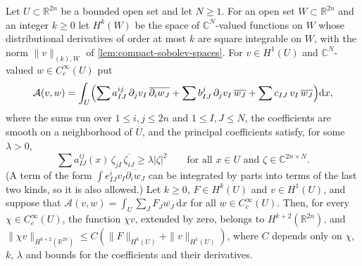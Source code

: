\begin{lemma}\label{lem:divergence-form-interior-regularity}
Let $U\subset\mathbb R^{2n}$ be a bounded open set and let $N\geq1$. For an open set $W\subset\mathbb R^{2n}$ and an integer $k\geq0$ let $H^k(W)$ be the space of $\mathbb C^N$-valued functions on $W$ whose distributional derivatives of order at most $k$ are square integrable on $W$, with the norm $\|v\|_{(k),W}$ of \cref{lem:compact-sobolev-spaces}. For $v\in H^1(U)$ and $\mathbb C^N$-valued $w\in C^\infty_c(U)$ put
\[
 \mathcal A(v,w)=\int_U\Bigl(\sum a^{ij}_{IJ}\,\partial_jv_I\,\overline{\partial_iw_J}
   +\sum b^j_{IJ}\,\partial_jv_I\,\overline{w_J}+\sum c_{IJ}\,v_I\,\overline{w_J}\Bigr)\mathrm dx,
\]
where the sums run over $1\leq i,j\leq2n$ and $1\leq I,J\leq N$, the coefficients are smooth on a neighborhood of $\overline U$, and the principal coefficients satisfy, for some $\lambda>0$,
\[
 \sum a^{ij}_{IJ}(x)\,\zeta_{jI}\,\overline{\zeta_{iJ}}\geq\lambda|\zeta|^2
 \qquad\text{for all }x\in U\text{ and }\zeta\in\mathbb C^{2n\times N}.
\]
(A term of the form $\int e^i_{IJ}v_I\overline{\partial_iw_J}$ can be integrated by parts into terms of the last two kinds, so it is also allowed.) Let $k\geq0$, $F\in H^k(U)$ and $v\in H^1(U)$, and suppose that $\mathcal A(v,w)=\int_U\sum_JF_J\overline{w_J}\,\mathrm dx$ for all $w\in C^\infty_c(U)$. Then, for every $\chi\in C^\infty_c(U)$, the function $\chi v$, extended by zero, belongs to $H^{k+2}(\mathbb R^{2n})$, and $\|\chi v\|_{H^{k+2}(\mathbb R^{2n})}\leq C(\|F\|_{H^k(U)}+\|v\|_{H^1(U)})$, where $C$ depends only on $\chi$, $k$, $\lambda$ and bounds for the coefficients and their derivatives.
\end{lemma}

